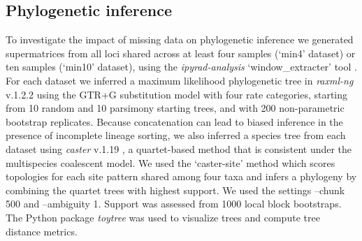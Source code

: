 \documentclass[11pt]{article}
\begin{document}
\subsection{Phylogenetic inference}
To investigate the impact of missing data on phylogenetic inference 
we generated supermatrices from all loci shared across at least four 
samples (`min4' dataset) or ten samples (`min10' dataset), using the
\emph{ipyrad-analysis} ‘window\_extracter’ tool \citep{eaton_ipyrad_2020}.
% 
For each dataset we inferred a maximum likelihood phylogenetic tree in
\emph{raxml-ng} v.1.2.2 \citep{kozlov_raxml-ng_2019} using the GTR+G substitution
model with four rate categories, starting from 10 random and 10 parsimony 
starting trees, and with 200 non-parametric bootstrap replicates. 
% 
Because concatenation can lead to biased inference in the presence of incomplete
lineage sorting, we also inferred a species tree from each dataset using 
\emph{caster} v.1.19 \citep{doi:10.1126/science.adk9688}, 
a quartet-based method that is consistent under the multispecies coalescent model. 
We used the `caster-site’ method which scores topologies for each site pattern 
shared among four taxa and infers a phylogeny by combining the quartet
trees with highest support. We used the settings --chunk 500 and --ambiguity 1. 
Support was assessed from 1000 local block bootstraps. 
The Python package \emph{toytree} \citep{eaton_toytree_2020} was used to 
visualize trees and compute tree distance metrics.

\end{document}
